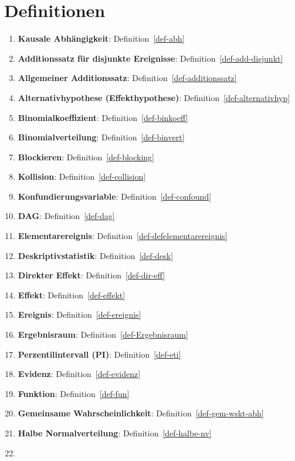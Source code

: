 \documentclass[
  ngerman,
  letterpaper,
  twoside,
  open=any]{scrbook}
\theoremstyle{definition}
\theoremstyle{plain}
\theoremstyle{definition}
\theoremstyle{definition}
\theoremstyle{definition}
\theoremstyle{definition}
\theoremstyle{remark}
\begin{document}
\chapter{Definitionen}\label{definitionen}

\begin{enumerate}
\def\labelenumi{\arabic{enumi}.}
\item
  \textbf{Kausale Abhängigkeit}: Definition~\ref{def-abh}
\item
  \textbf{Additionssatz für disjunkte Ereignisse}:
  Definition~\ref{def-add-disjunkt}
\item
  \textbf{Allgemeiner Additionssatz}: Definition~\ref{def-additionssatz}
\item
  \textbf{Alternativhypothese (Effekthypothese)}:
  Definition~\ref{def-alternativhyp}
\item
  \textbf{Binomialkoeffizient}: Definition~\ref{def-binkoeff}
\item
  \textbf{Binomialverteilung}: Definition~\ref{def-binvert}
\item
  \textbf{Blockieren}: Definition~\ref{def-blocking}
\item
  \textbf{Kollision}: Definition~\ref{def-collision}
\item
  \textbf{Konfundierungsvariable}: Definition~\ref{def-confound}
\item
  \textbf{DAG}: Definition~\ref{def-dag}
\item
  \textbf{Elementarereignis}: Definition~\ref{def-defelementarereignis}
\item
  \textbf{Deskriptivstatistik}: Definition~\ref{def-desk}
\item
  \textbf{Direkter Effekt}: Definition~\ref{def-dir-eff}
\item
  \textbf{Effekt}: Definition~\ref{def-effekt}
\item
  \textbf{Ereignis}: Definition~\ref{def-ereignis}
\item
  \textbf{Ergebnisraum}: Definition~\ref{def-Ergebnisraum}
\item
  \textbf{Perzentilintervall (PI)}: Definition~\ref{def-eti}
\item
  \textbf{Evidenz}: Definition~\ref{def-evidenz}
\item
  \textbf{Funktion}: Definition~\ref{def-fun}
\item
  \textbf{Gemeinsame Wahrscheinlichkeit}:
  Definition~\ref{def-gem-wskt-abh}
\item
  \textbf{Halbe Normalverteilung}: Definition~\ref{def-halbe-nv}
\item

\end{enumerate}
\end{document}
